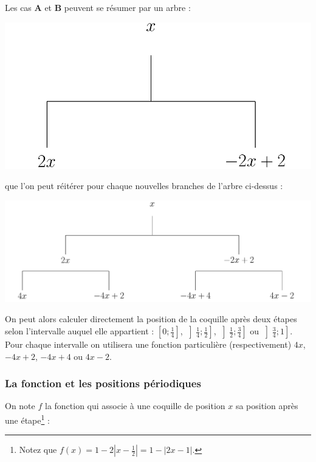 \documentclass[a4paper,french,12pt]{article}
\begin{document}
Les cas \textbf{A} et \textbf{B} peuvent se résumer par un arbre :

\begin{center}
\includegraphics[scale=0.45]{../TeXGraph/Pdf/visuel_2D_arbre.pdf}
\end{center}
que l'on peut réitérer pour chaque nouvelles branches de l'arbre ci-dessus :

\begin{center}
\includegraphics[scale=0.45]{../TeXGraph/Pdf/visuel_2D_arbre_2.pdf}
\end{center}
On peut alors calculer directement la position de la coquille après deux étapes selon l'intervalle auquel elle appartient : $\left[0;\frac{1}{4}\right]$, $\left]\frac{1}{4};\frac{1}{2}\right]$, $\left]\frac{1}{2};\frac{3}{4}\right]$ ou  $\left]\frac{3}{4};1\right]$. Pour chaque intervalle on utilisera une fonction particulière (respectivement) $4x$, $-4x+2$, $-4x+4$ ou $4x-2$.


\subsubsection{La fonction et les positions périodiques}
On note $f$ la fonction qui associe à une coquille de position $x$ sa position après une étape\footnote{\hypertarget{note4}{}Notez que $f\left(x\right)=1-2\left\lvert x-\frac{1}{2}\right\rvert=1-\left\lvert2x-1\right\rvert$.} :
\end{document}

